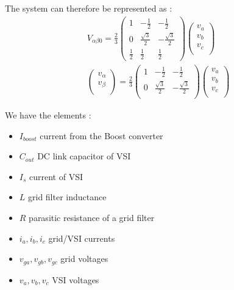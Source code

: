 \documentclass[../main.tex]{subfiles}
\begin{document}
The system can therefore be represented as : \begin{equation}
    \begin{gathered}
        V_{\alpha \beta 0} = \frac{2}{3} \begin{pmatrix}
            1 & -\frac{1}{2} & -\frac{1}{2}\\
            0 & \frac{\sqrt{3}}{2} & -\frac{\sqrt{3}}{2}\\
            \frac{1}{2} & \frac{1}{2} & \frac{1}{2}
        \end{pmatrix} \begin{pmatrix}
            v_a\\ v_b\\ v_c\\
        \end{pmatrix}\\
        \begin{pmatrix}
            v_\alpha\\ v_\beta\\ 
        \end{pmatrix} = \frac{2}{3} \begin{pmatrix}
            1 & -\frac{1}{2} & -\frac{1}{2}\\
            0 & \frac{\sqrt{3}}{2} & -\frac{\sqrt{3}}{2}\\
        \end{pmatrix} \begin{pmatrix}
            v_a\\ v_b\\ v_c\\
        \end{pmatrix}
    \end{gathered}
\end{equation}

We have the elements : \begin{itemize}
    \item $I_{boost}$ current from the Boost converter
    \item $C_{out}$ DC link capacitor of VSI
    \item $I_s$ current of VSI
    \item $L$ grid filter inductance
    \item $R$ parasitic resistance of a grid filter
    \item $i_a, i_b, i_c$ grid/VSI currents
    \item $v_{ga}, v_{gb}, v_{gc}$ grid voltages
    \item $v_a, v_b, v_c$ VSI voltages
\end{itemize}
\end{document}
